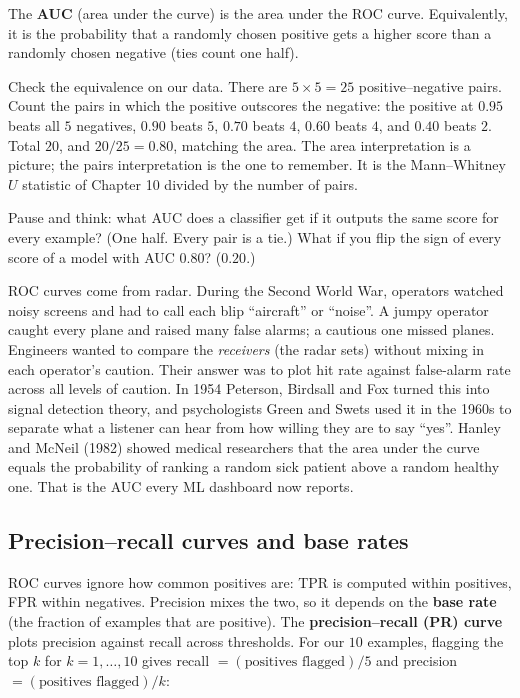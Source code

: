 \begin{definition}[AUC]
The \textbf{AUC} (area under the curve) is the area under the ROC curve. Equivalently, it is the probability that a
randomly chosen positive gets a higher score than a randomly chosen negative (ties count
one half).
\end{definition}

Check the equivalence on our data. There are $5\times5=25$ positive--negative pairs. Count the
pairs in which the positive outscores the negative: the positive at $0.95$ beats all $5$
negatives, $0.90$ beats $5$, $0.70$ beats $4$, $0.60$ beats $4$, and $0.40$ beats $2$. Total
$20$, and $20/25 = 0.80$, matching the area. The area interpretation is a picture; the pairs
interpretation is the one to remember. It is the Mann--Whitney $U$ statistic of Chapter 10
divided by the number of pairs.

\begin{recoverybox}
Pause and think: what AUC does a classifier get if it outputs the same score for every
example? (One half. Every pair is a tie.) What if you flip the sign of every score of a model
with AUC $0.80$? ($0.20$.)
\end{recoverybox}

\begin{historybox}
ROC curves come from radar. During the Second World War, operators watched noisy screens and
had to call each blip ``aircraft'' or ``noise''. A jumpy operator caught every plane and raised
many false alarms; a cautious one missed planes. Engineers wanted to compare the
\emph{receivers} (the radar sets) without mixing in each operator's caution. Their answer was to
plot hit rate against false-alarm rate across all levels of caution. In 1954 Peterson, Birdsall
and Fox turned this into signal detection theory, and psychologists Green and Swets used it in
the 1960s to separate what a listener can hear from how willing they are to say ``yes''.
Hanley and McNeil (1982) showed medical researchers that the area under the curve equals the
probability of ranking a random sick patient above a random healthy one. That is the AUC every
ML dashboard now reports.
\end{historybox}

\subsection{Precision--recall curves and base rates}

ROC curves ignore how common positives are: TPR is computed within positives, FPR within
negatives. Precision mixes the two, so it depends on the \textbf{base rate} (the fraction of
examples that are positive). The \textbf{precision--recall (PR) curve} plots precision against
recall across thresholds. For our $10$ examples, flagging the top $k$ for $k=1,\dots,10$ gives
recall $=(\text{positives flagged})/5$ and precision $=(\text{positives flagged})/k$:

